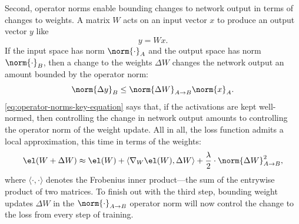 Second, operator norms enable bounding changes to network output in terms of changes to weights. A matrix $W$ acts on an input vector $x$ to produce an output vector $y$ like \begin{equation}
    y = Wx.
\end{equation} If the input space has norm $\norm{\cdot}_A$ and the output space has norm $\norm{\cdot}_B$, then a change to the weights $\Delta W$ changes the network output an amount bounded by the operator norm: \begin{equation}
    \label{eq:operator-norms-key-equation}
    \norm{\Delta y}_B \leq \norm{\Delta W}_{A \to B} \norm{x}_A.
\end{equation} \cref{eq:operator-norms-key-equation} says that, if the activations are kept well-normed, then controlling the change in network output amounts to controlling the operator norm of the weight update. All in all, the loss function admits a local approximation, this time in terms of the weights: \begin{equation}
    \label{eq:steepest-descent-loss}
    \el(W + \Delta W) \approx \el(W) + \langle \nabla_W \el(W), \Delta W \rangle + \frac{\lambda}{2}\cdot \norm{\Delta W}_{A \to B}^2,
\end{equation} where $\langle \cdot, \cdot \rangle$ denotes the Frobenius inner product---the sum of the entrywise product of two matrices. To finish out with the third step, bounding weight updates $\Delta W$ in the $\norm{\cdot}_{A \to B}$ operator norm will now control the change to the loss from every step of training.

